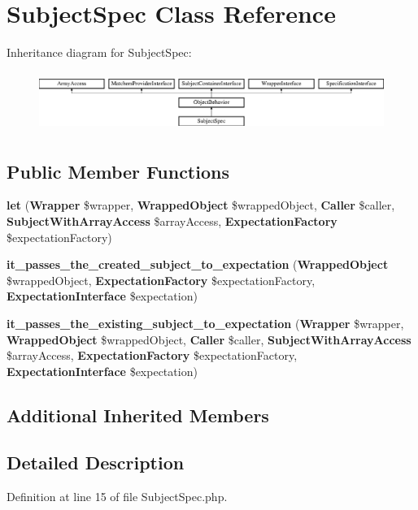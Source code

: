 \section{Subject\+Spec Class Reference}
\label{classspec_1_1_php_spec_1_1_wrapper_1_1_subject_spec}
Inheritance diagram for Subject\+Spec\+:\begin{figure}[H]
\begin{center}
\leavevmode
\includegraphics[height=1.953488cm]{classspec_1_1_php_spec_1_1_wrapper_1_1_subject_spec}
\end{center}
\end{figure}
\subsection*{Public Member Functions}
\begin{DoxyCompactItemize}
\item 
{\bf let} ({\bf Wrapper} \$wrapper, {\bf Wrapped\+Object} \$wrapped\+Object, {\bf Caller} \$caller, {\bf Subject\+With\+Array\+Access} \$array\+Access, {\bf Expectation\+Factory} \$expectation\+Factory)
\item 
{\bf it\+\_\+passes\+\_\+the\+\_\+created\+\_\+subject\+\_\+to\+\_\+expectation} ({\bf Wrapped\+Object} \$wrapped\+Object, {\bf Expectation\+Factory} \$expectation\+Factory, {\bf Expectation\+Interface} \$expectation)
\item 
{\bf it\+\_\+passes\+\_\+the\+\_\+existing\+\_\+subject\+\_\+to\+\_\+expectation} ({\bf Wrapper} \$wrapper, {\bf Wrapped\+Object} \$wrapped\+Object, {\bf Caller} \$caller, {\bf Subject\+With\+Array\+Access} \$array\+Access, {\bf Expectation\+Factory} \$expectation\+Factory, {\bf Expectation\+Interface} \$expectation)
\end{DoxyCompactItemize}
\subsection*{Additional Inherited Members}


\subsection{Detailed Description}


Definition at line 15 of file Subject\+Spec.\+php.



